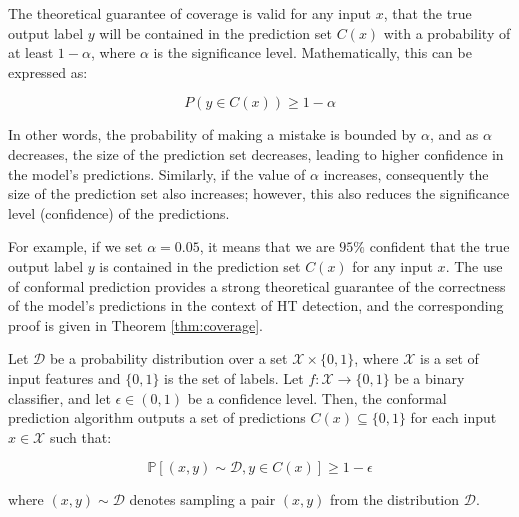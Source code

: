 The theoretical guarantee of coverage is valid for any input $x$, that the true output label $y$ will be contained in the prediction set $C(x)$ with a probability of at least $1 - \alpha$, where $\alpha$ is the significance level. Mathematically, this can be expressed as:

$$
P(y \in C(x)) \geq 1 - \alpha
$$

In other words, the probability of making a mistake is bounded by $\alpha$, and as $\alpha$ decreases, the size of the prediction set decreases, leading to higher confidence in the model's predictions. Similarly, if the value of $\alpha$ increases, consequently the size of the prediction set also increases; however, this also reduces the significance level (confidence) of the predictions. 

For example, if we set $\alpha = 0.05$, it means that we are $95\%$ confident that the true output label $y$ is contained in the prediction set $C(x)$ for any input $x$. The use of conformal prediction provides a strong theoretical guarantee of the correctness of the model's predictions in the context of HT detection, and the corresponding proof is given in Theorem \ref{thm:coverage}.

\begin{theorem}\label{thm:coverage}
Let $\mathcal{D}$ be a probability distribution over a set $\mathcal{X} \times \{0,1\}$, where $\mathcal{X}$ is a set of input features and $\{0,1\}$ is the set of labels. Let $f: \mathcal{X} \to \{0,1\}$ be a binary classifier, and let $\epsilon \in (0,1)$ be a confidence level. Then, the conformal prediction algorithm outputs a set of predictions $C(x) \subseteq \{0,1\}$ for each input $x \in \mathcal{X}$ such that:

\begin{equation*}
\mathbb{P}[(x,y) \sim \mathcal{D}, y \in C(x)] \geq 1-\epsilon
\end{equation*}

where $(x,y) \sim \mathcal{D}$ denotes sampling a pair $(x,y)$ from the distribution $\mathcal{D}$.

\end{theorem}


